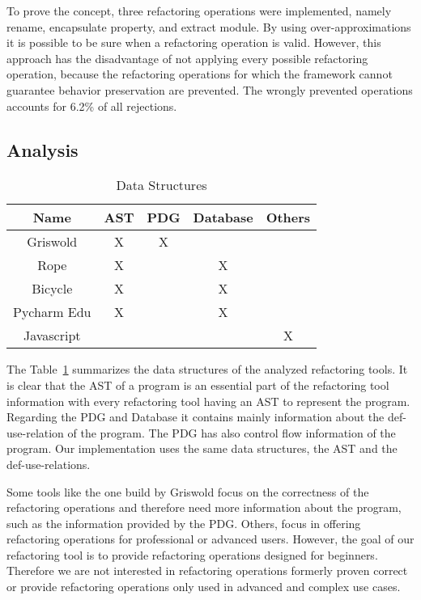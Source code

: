 To prove the concept, three refactoring operations were implemented,
namely rename, encapsulate property, and extract module.  By using
over-approximations it is possible to be sure when a refactoring
operation is valid.  However, this approach has the disadvantage of
not applying every possible refactoring operation, because the
refactoring operations for which the framework cannot guarantee
behavior preservation are prevented.  The wrongly prevented operations
accounts for 6.2\% of all rejections.


\subsection{Analysis}
\begin{table}[]
\centering
\caption{Data Structures}
\label{tab:my-table}
\begin{tabular}{c|c|c|c|c}
Name       & AST & PDG & Database & Others \\ \hline
Griswold   & X   & X   &          &        \\ \hline
Rope       & X   &     & X        &        \\ \hline
Bicycle    & X   &     & X        &        \\ \hline
Pycharm Edu & X   &     & X        &        \\ \hline
Javascript &     &     &          & X
\end{tabular}
\end{table}

The Table~\ref{tab:my-table} summarizes the data structures of the analyzed refactoring tools.
It is clear that the AST of a program is an essential part of the refactoring
tool information with every refactoring tool having an AST to represent the program.
Regarding the PDG and Database it contains mainly information about the def-use-relation
of the program. The PDG has also control flow information of the program.
Our implementation uses the same data structures, the AST and
the def-use-relations.



Some tools like the one build by Griswold focus on the correctness of the refactoring
operations and therefore need more information about the program, such as the information
provided by the PDG.
Others, focus in offering refactoring operations for professional or advanced users.
However, the goal of our refactoring tool is to provide refactoring operations
designed for beginners.
Therefore we are not interested in refactoring operations formerly proven
correct or provide refactoring operations only used in advanced and complex use cases.

